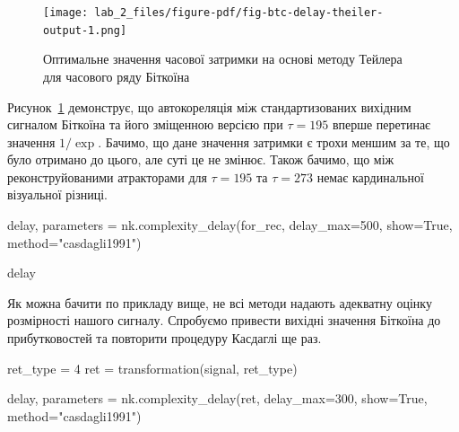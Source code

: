 \documentclass[
  letterpaper,
]{report}
\newenvironment{Shaded}{\begin{snugshade}}{\end{snugshade}}
\newcommand{\DecValTok}[1]{\textcolor[rgb]{0.68,0.00,0.00}{#1}}
\newcommand{\NormalTok}[1]{\textcolor[rgb]{0.00,0.23,0.31}{#1}}
\newcommand{\OperatorTok}[1]{\textcolor[rgb]{0.37,0.37,0.37}{#1}}
\newcommand{\StringTok}[1]{\textcolor[rgb]{0.13,0.47,0.30}{#1}}
\newcommand{\VariableTok}[1]{\textcolor[rgb]{0.07,0.07,0.07}{#1}}
\begin{document}
\begin{figure}[H]

{\centering \texttt{[image: lab\_2\_files/figure-pdf/fig-btc-delay-theiler-output-1.png]}

}

\caption{\label{fig-btc-delay-theiler}Оптимальне значення часової
затримки на основі методу Тейлера для часового ряду Біткоїна}

\end{figure}

Рисунок~\ref{fig-btc-delay-theiler} демонструє, що автокореляція між
стандартизованих вихідним сигналом Біткоїна та його зміщенною версією
при \(\tau=195\) вперше перетинає значення \(1/\exp\). Бачимо, що дане
значення затримки є трохи меншим за те, що було отримано до цього, але
суті це не змінює. Також бачимо, що між реконструйованими атракторами
для \(\tau=195\) та \(\tau=273\) немає кардинальної візуальної різниці.

\begin{Shaded}
\begin{Highlighting}[]
\NormalTok{delay, parameters }\OperatorTok{=}\NormalTok{ nk.complexity\_delay(for\_rec, }
\NormalTok{                                        delay\_max}\OperatorTok{=}\DecValTok{500}\NormalTok{, show}\OperatorTok{=}\VariableTok{True}\NormalTok{,}
\NormalTok{                                        method}\OperatorTok{=}\StringTok{"casdagli1991"}\NormalTok{)}

\NormalTok{delay}
\end{Highlighting}
\end{Shaded}

Як можна бачити по прикладу вище, не всі методи надають адекватну оцінку
розмірності нашого сигналу. Спробуємо привести вихідні значення Біткоїна
до прибутковостей та повторити процедуру Касдаглі ще раз.

\begin{Shaded}
\begin{Highlighting}[]
\NormalTok{ret\_type }\OperatorTok{=} \DecValTok{4} 
\NormalTok{ret }\OperatorTok{=}\NormalTok{ transformation(signal, ret\_type)}
\end{Highlighting}
\end{Shaded}

\begin{Shaded}
\begin{Highlighting}[]
\NormalTok{delay, parameters }\OperatorTok{=}\NormalTok{ nk.complexity\_delay(ret, }
\NormalTok{                                        delay\_max}\OperatorTok{=}\DecValTok{300}\NormalTok{, show}\OperatorTok{=}\VariableTok{True}\NormalTok{,}
\NormalTok{                                        method}\OperatorTok{=}\StringTok{"casdagli1991"}\NormalTok{)}
\end{Highlighting}
\end{Shaded}
\end{document}
